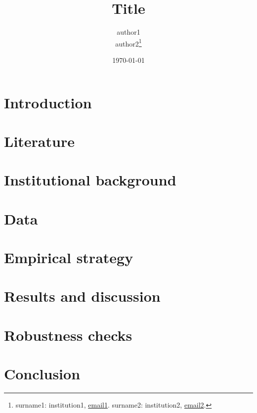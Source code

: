 \documentclass[AER, draftmode]{AEA}
\begin{document}
\title{Title}


\author{
  author1\\
  author2\thanks{
  surname1: institution1, \href{mailto:email1}{email1}.
  surname2: institution2, \href{mailto:email2}{email2}.
}
}

\date{\today}
\pubMonth{}
\pubYear{}
\pubVolume{}
\pubIssue{}
\JEL{}
\Keywords{}

\begin{abstract}

\end{abstract}


\maketitle

\hypertarget{introduction}{%
\section{Introduction}\label{introduction}}

\hypertarget{literature}{%
\section{Literature}\label{literature}}

\hypertarget{institutional-background}{%
\section{Institutional background}\label{institutional-background}}

\hypertarget{data}{%
\section{Data}\label{data}}

\hypertarget{empirical-strategy}{%
\section{Empirical strategy}\label{empirical-strategy}}

\hypertarget{results-and-discussion}{%
\section{Results and discussion}\label{results-and-discussion}}

\hypertarget{robustness-checks}{%
\section{Robustness checks}\label{robustness-checks}}

\hypertarget{conclusion}{%
\section{Conclusion}\label{conclusion}}

\setlength{\baselineskip}{0pt}
\renewcommand*\MakeUppercase[1]{#1}\printbibliography

\appendix
\end{document}
